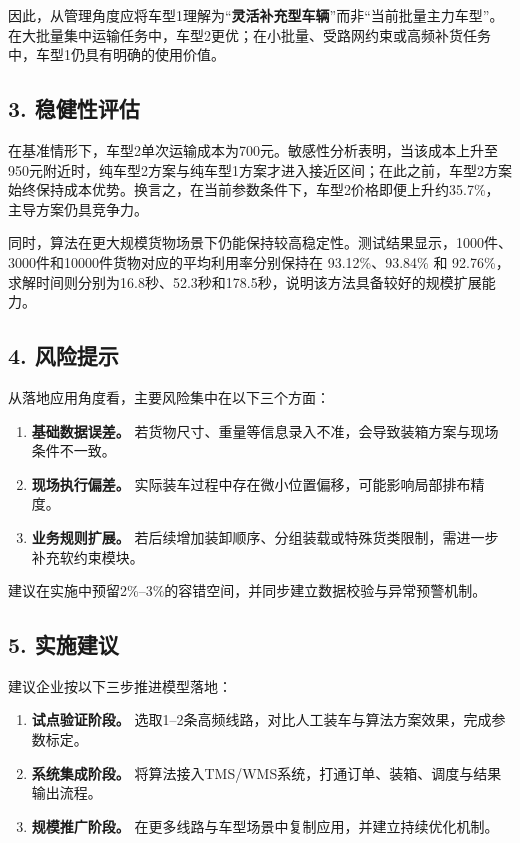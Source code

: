 \documentclass{MMCStyle}
\begin{document}
\noindent
因此，从管理角度应将车型1理解为“\textbf{灵活补充型车辆}”而非“当前批量主力车型”。在大批量集中运输任务中，车型2更优；在小批量、受路网约束或高频补货任务中，车型1仍具有明确的使用价值。

\subsection*{3. 稳健性评估}

\noindent
在基准情形下，车型2单次运输成本为700元。敏感性分析表明，当该成本上升至950元附近时，纯车型2方案与纯车型1方案才进入接近区间；在此之前，车型2方案始终保持成本优势。换言之，在当前参数条件下，车型2价格即便上升约35.7\%，主导方案仍具竞争力。

\noindent
同时，算法在更大规模货物场景下仍能保持较高稳定性。测试结果显示，1000件、3000件和10000件货物对应的平均利用率分别保持在 93.12\%、93.84\% 和 92.76\%，求解时间则分别为16.8秒、52.3秒和178.5秒，说明该方法具备较好的规模扩展能力。

\subsection*{4. 风险提示}

\noindent
从落地应用角度看，主要风险集中在以下三个方面：

\begin{enumerate}
\item \textbf{基础数据误差。} 若货物尺寸、重量等信息录入不准，会导致装箱方案与现场条件不一致。
\item \textbf{现场执行偏差。} 实际装车过程中存在微小位置偏移，可能影响局部排布精度。
\item \textbf{业务规则扩展。} 若后续增加装卸顺序、分组装载或特殊货类限制，需进一步补充软约束模块。
\end{enumerate}

\noindent
建议在实施中预留2\%--3\%的容错空间，并同步建立数据校验与异常预警机制。

\subsection*{5. 实施建议}

\noindent
建议企业按以下三步推进模型落地：

\begin{enumerate}
\item \textbf{试点验证阶段。} 选取1--2条高频线路，对比人工装车与算法方案效果，完成参数标定。
\item \textbf{系统集成阶段。} 将算法接入TMS/WMS系统，打通订单、装箱、调度与结果输出流程。
\item \textbf{规模推广阶段。} 在更多线路与车型场景中复制应用，并建立持续优化机制。
\end{enumerate}
\end{document}
